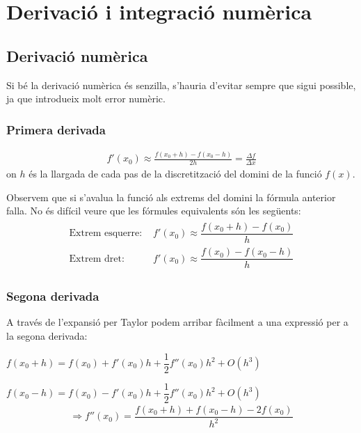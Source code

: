 \section{Derivació i integració numèrica}
\subsection{Derivació numèrica}
Si bé la derivació numèrica és senzilla, s'hauria d'evitar sempre que sigui possible, ja que introdueix molt error numèric.
\subsubsection*{Primera derivada}
\begin{align}
    \boxed{f'(x_{0}) \approx \frac{f(x_{0} + h) - f(x_{0} - h)}{2h} = \frac{\Delta f}{\Delta x}}
\end{align}
on $h$ és la llargada de cada pas de la discretització del domini de la funció $f(x)$.

Observem que si s'avalua la funció als extrems del domini la fórmula anterior falla. No és difícil veure que les fórmules equivalents són les següents:
\begin{align*}
\begin{aligned}
    \text{Extrem esquerre: } &  f'(x_{0}) \approx \dfrac{f(x_{0} + h) - f(x_{0})}{h} \\
    \text{Extrem dret: } &  f'(x_{0}) \approx \dfrac{f(x_{0}) - f(x_{0} - h)}{h}
\end{aligned}
\end{align*}

\subsubsection*{Segona derivada}
A través de l'expansió per Taylor podem arribar fàcilment a una expressió per a la segona derivada:

$f(x_{0} + h) = f(x_{0}) + f'(x_{0})h + \dfrac{1}{2} f''(x_{0})h^{2} + O(h^{3})$

$f(x_{0} -h) = f(x_{0}) - f'(x_{0})h + \dfrac{1}{2} f''(x_{0})h^{2} + O(h^{3})$
\begin{align}
    \Rightarrow \boxed{f''(x_{0}) = \dfrac{f(x_{0} + h) + f(x_{0} - h) - 2f(x_{0}) }{h^{2}}}
\end{align}

